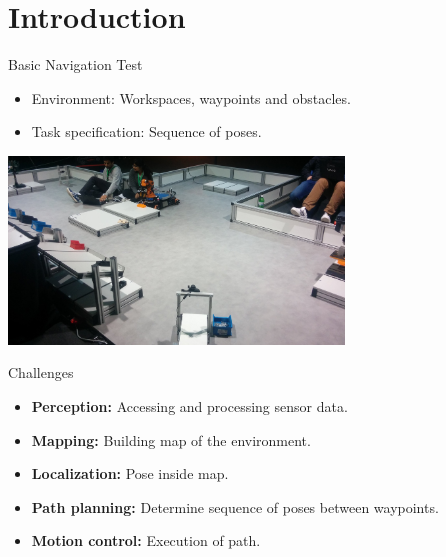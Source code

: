 
\section{Introduction}


\begin{frame}{Basic Navigation Test}
\begin{itemize}
    \item Environment: Workspaces, waypoints and obstacles.
    \item Task specification: Sequence of poses.
\end{itemize}
\centering \includegraphics[height=50mm]{gfx/arena.jpg}
\end{frame}

\begin{frame}{Challenges}
\begin{itemize}
    \item \textbf{Perception:} Accessing and processing sensor data.
    \item \textbf{Mapping:} Building map of the environment.
    \item \textbf{Localization:} Pose inside map.
    \item \textbf{Path planning:} Determine sequence of poses between waypoints.
    \item \textbf{Motion control:} Execution of path.
\end{itemize}
\end{frame}

